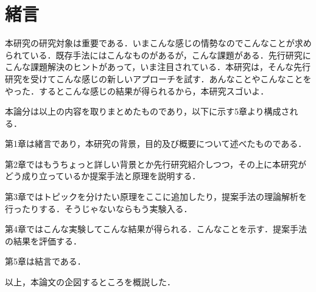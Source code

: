 \chapter{緒言}

本研究の研究対象は重要である．いまこんな感じの情勢なのでこんなことが求められている．既存手法にはこんなものがあるが，こんな課題がある．先行研究にこんな課題解決のヒントがあって，いま注目されている．本研究は，そんな先行研究を受けてこんな感じの新しいアプローチを試す．あんなことやこんなことをやった．するとこんな感じの結果が得られるから，本研究スゴいよ．

本論分は以上の内容を取りまとめたものであり，以下に示す5章より構成される．

第1章は緒言であり，本研究の背景，目的及び概要について述べたものである．

第2章ではもうちょっと詳しい背景とか先行研究紹介しつつ，その上に本研究がどう成り立っているか提案手法と原理を説明する．

第3章ではトピックを分けたい原理をここに追加したり，提案手法の理論解析を行ったりする．そうじゃないならもう実験入る．

第4章ではこんな実験してこんな結果が得られる．こんなことを示す．提案手法の結果を評価する．

第5章は結言である．

以上，本論文の企図するところを概説した．
